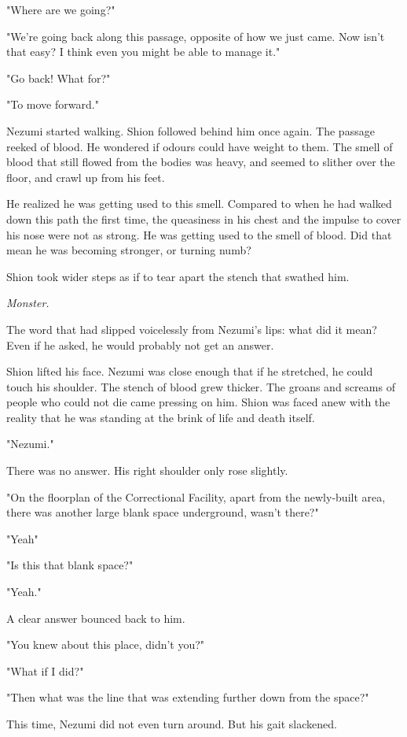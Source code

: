 "Where are we going?"

"We're going back along this passage, opposite of how we just came. Now
isn't that easy? I think even you might be able to manage it."

"Go back! What for?"

"To move forward."

Nezumi started walking. Shion followed behind him once again. The
passage reeked of blood. He wondered if odours could have weight to
them. The smell of blood that still flowed from the bodies was heavy,
and seemed to slither over the floor, and crawl up from his feet.

He realized he was getting used to this smell. Compared to when he had
walked down this path the first time, the queasiness in his chest and
the impulse to cover his nose were not as strong. He was getting used to
the smell of blood. Did that mean he was becoming stronger, or turning
numb?

Shion took wider steps as if to tear apart the stench that swathed him.

\emph{Monster.}

The word that had slipped voicelessly from Nezumi's lips: what did it
mean? Even if he asked, he would probably not get an answer.

Shion lifted his face. Nezumi was close enough that if he stretched, he
could touch his shoulder. The stench of blood grew thicker. The groans
and screams of people who could not die came pressing on him. Shion was
faced anew with the reality that he was standing at the brink of life
and death itself.

"Nezumi."

There was no answer. His right shoulder only rose slightly.

"On the floorplan of the Correctional Facility, apart from the
newly-built area, there was another large blank space underground,
wasn't there?"

"Yeah\el "

"Is this that blank space?"

"Yeah."

A clear answer bounced back to him.

"You knew about this place, didn't you?"

"What if I did?"

"Then what was the line that was extending further down from the space?"

This time, Nezumi did not even turn around. But his gait slackened.

